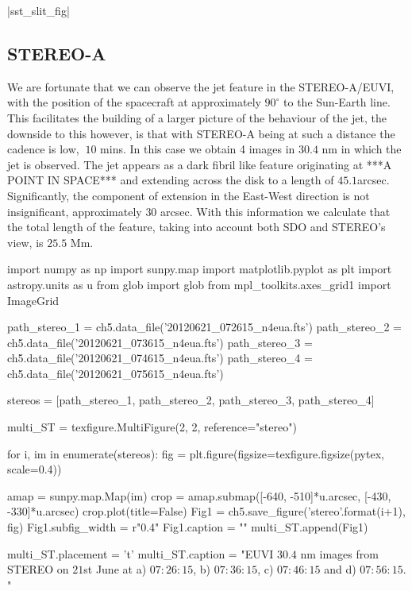 \py[chapter5]|sst_slit_fig|



\subsection{STEREO-A}
We are fortunate that we can observe the jet feature in the STEREO-A/EUVI, with the position of the spacecraft at approximately $90^\circ$ to the Sun-Earth line.
This facilitates the building of a larger picture of the behaviour of the jet, the downside to this however, is that with STEREO-A being at such a distance the cadence is low, $~10$ mins.
In this case we obtain 4 images in $30.4$ nm in which the jet is observed.
The jet appears as a dark fibril like feature originating at ***A POINT IN SPACE*** and extending across the disk to a length of $45.1$arcsec.
Significantly, the component of extension in the East-West direction is not insignificant, approximately $30$ arcsec.
With this information we calculate that the total length of the feature, taking into account both SDO and STEREO's view, is $25.5$ Mm.



\begin{pycode}[chapter5]
import numpy as np
import sunpy.map
import matplotlib.pyplot as plt
import astropy.units as u
from glob import glob
from mpl_toolkits.axes_grid1 import ImageGrid

path_stereo_1 = ch5.data_file('20120621_072615_n4eua.fts')
path_stereo_2 = ch5.data_file('20120621_073615_n4eua.fts')
path_stereo_3 = ch5.data_file('20120621_074615_n4eua.fts')
path_stereo_4 = ch5.data_file('20120621_075615_n4eua.fts')

stereos = [path_stereo_1, path_stereo_2, path_stereo_3, path_stereo_4]


multi_ST = texfigure.MultiFigure(2, 2, reference="stereo")


for i, im in enumerate(stereos):
	fig = plt.figure(figsize=texfigure.figsize(pytex, scale=0.4))
	
	amap = sunpy.map.Map(im)
	crop = amap.submap([-640, -510]*u.arcsec, [-430, -330]*u.arcsec)
	crop.plot(title=False)
	Fig1 = ch5.save_figure('stereo{}'.format(i+1), fig)
	Fig1.subfig_width = r"0.4\textwidth"
	Fig1.caption = ""
	multi_ST.append(Fig1)

multi_ST.placement = 't'
multi_ST.caption = "EUVI $30.4$ nm images from STEREO on $21$st June at a) $07:26:15$, b) $07:36:15$, c) $07:46:15$ and d) $07:56:15$. "
\end{pycode}


